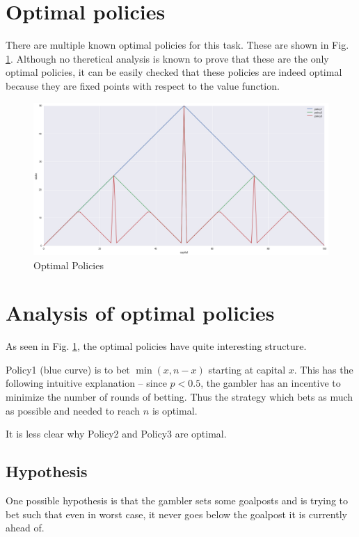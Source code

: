 \documentclass{article}
\begin{document}
\section{Optimal policies}

There are multiple known optimal policies for this task. These are shown in Fig. \ref{opt_policies}. Although no theretical analysis is known to prove that these are the only optimal policies, it can be easily checked that these policies are indeed optimal because they are fixed points with respect to the value function.

\begin{figure}
    \centering
    \includegraphics[width=\textwidth]{figure_3}
    \caption{Optimal Policies}
    \label{opt_policies}
\end{figure}


\section{Analysis of optimal policies}

As seen in Fig. \ref{opt_policies}, the optimal policies have quite interesting structure.

Policy1 (blue curve) is to bet $\min (x, n-x)$ starting at capital $x$. This has the following intuitive explanation -- since $p < 0.5$, the gambler has an incentive to minimize the number of rounds of betting. Thus the strategy which bets as much as possible and needed to reach $n$ is optimal.

It is less clear why Policy2 and Policy3 are optimal.

\subsection{Hypothesis}

One possible hypothesis is that the gambler sets some goalposts and is trying to bet such that even in worst case, it never goes below the goalpost it is currently ahead of.
\end{document}
